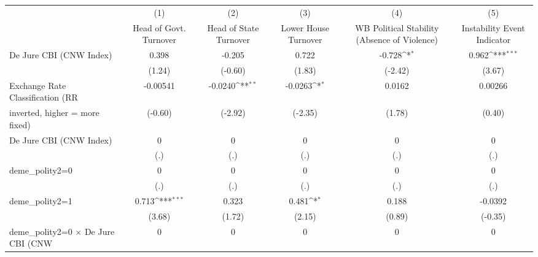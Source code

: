 {
\def\sym#1{\ifmmode^{#1}\else\(^{#1}\)\fi}
\begin{tabular}{l*{5}{c}}
\toprule
                                        &\multicolumn{1}{c}{(1)}&\multicolumn{1}{c}{(2)}&\multicolumn{1}{c}{(3)}&\multicolumn{1}{c}{(4)}&\multicolumn{1}{c}{(5)}\\
                                        &\multicolumn{1}{c}{Head of Govt. Turnover}&\multicolumn{1}{c}{Head of State Turnover}&\multicolumn{1}{c}{Lower House Turnover}&\multicolumn{1}{c}{WB Political Stability (Absence of Violence)}&\multicolumn{1}{c}{Instability Event Indicator}\\
\midrule
De Jure CBI (CNW Index)                 &    0.398         &   -0.205         &    0.722         &   -0.728\sym{*}  &    0.962\sym{***}\\
                                        &   (1.24)         &  (-0.60)         &   (1.83)         &  (-2.42)         &   (3.67)         \\
\addlinespace
Exchange Rate Classification (RR        & -0.00541         &  -0.0240\sym{**} &  -0.0263\sym{*}  &   0.0162         &  0.00266         \\
inverted, higher = more fixed)          &  (-0.60)         &  (-2.92)         &  (-2.35)         &   (1.78)         &   (0.40)         \\
\addlinespace
De Jure CBI (CNW Index)                 &        0         &        0         &        0         &        0         &        0         \\
                                        &      (.)         &      (.)         &      (.)         &      (.)         &      (.)         \\
\addlinespace
deme\_polity2=0                          &        0         &        0         &        0         &        0         &        0         \\
                                        &      (.)         &      (.)         &      (.)         &      (.)         &      (.)         \\
\addlinespace
deme\_polity2=1                          &    0.713\sym{***}&    0.323         &    0.481\sym{*}  &    0.188         &  -0.0392         \\
                                        &   (3.68)         &   (1.72)         &   (2.15)         &   (0.89)         &  (-0.35)         \\
\addlinespace
deme\_polity2=0 $\times$ De Jure CBI (CNW&        0         &        0         &        0         &        0         &        0         \\

\end{tabular}}
